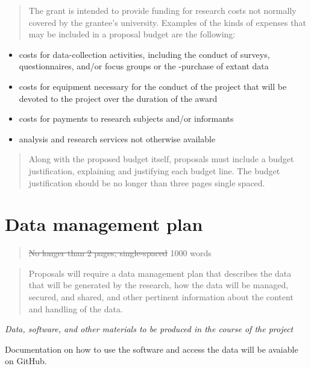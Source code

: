 \documentclass[
      12pt,
        ]{article}
\providecommand{\tightlist}{
  \setlength{\itemsep}{0pt}
  \setlength{\parskip}{0pt}
}
\begin{document}
\begin{quote}
The grant is intended to provide funding for research costs not normally covered by the grantee's university. Examples of the kinds of expenses that may be included in a proposal budget are the following:
\end{quote}

\begin{itemize}
\tightlist
\item
  costs for data-collection activities, including the conduct of surveys, questionnaires, and/or focus groups or the -purchase of extant data\\
\item
  costs for equipment necessary for the conduct of the project that will be devoted to the project over the duration of the award\\
\item
  costs for payments to research subjects and/or informants
\item
  analysis and research services not otherwise available
\end{itemize}

\begin{quote}
Along with the proposed budget itself, proposals must include a budget justification, explaining and justifying each budget line. The budget justification should be no longer than three pages single spaced.
\end{quote}

\newpage

\hypertarget{data-management-plan}{%
\section{Data management plan}\label{data-management-plan}}

\begin{quote}
\sout{No longer than 2 pages, single-spaced} 1000 words
\end{quote}

\begin{quote}
Proposals will require a data management plan that describes the data that will be generated by the research, how the data will be managed, secured, and shared, and other pertinent information about the content and handling of the data.
\end{quote}

\emph{Data, software, and other materials to be produced in the course of the project}

Documentation on how to use the software and access the data will be avaiable on GitHub.
\end{document}
